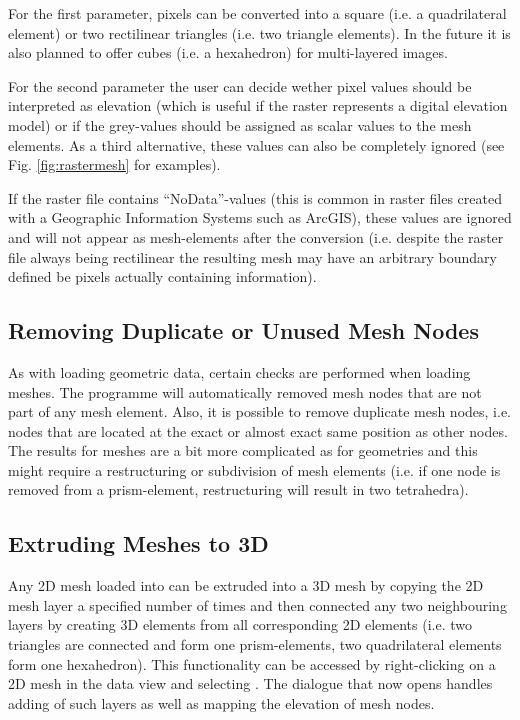 For the first parameter, pixels can be converted into a square (i.e. a quadrilateral element) or two rectilinear triangles (i.e. two triangle elements). In the future it is also planned to offer cubes (i.e. a hexahedron) for multi-layered images.

For the second parameter the user can decide wether pixel values should be interpreted as elevation (which is useful if the raster represents a digital elevation model) or if the grey-values should be assigned as scalar values to the mesh elements. As a third alternative, these values can also be completely ignored (see Fig. \ref{fig:rastermesh} for examples).

If the raster file contains ``NoData''-values (this is common in raster files created with a Geographic Information Systems such as ArcGIS), these values are ignored and will not appear as mesh-elements after the conversion  (i.e. despite the raster file always being rectilinear the resulting mesh may have an arbitrary boundary defined be pixels actually containing information).

\subsection{Removing Duplicate or Unused Mesh Nodes}

As with loading geometric data, certain checks are performed when loading meshes. The programme will automatically removed mesh nodes that are not part of any mesh element. Also, it is possible to remove duplicate mesh nodes, i.e. nodes that are located at the exact or almost exact same position as other nodes. The results for meshes are a bit more complicated as for geometries and this might require a restructuring or subdivision of mesh elements (i.e. if one node is removed from a prism-element, restructuring will result in two tetrahedra).

\subsection{Extruding Meshes to 3D}

Any 2D mesh loaded into \ogs can be extruded into a 3D mesh by copying the 2D mesh layer a specified number of times and then connected any two neighbouring layers by creating 3D elements from all corresponding 2D elements (i.e. two triangles are connected and form one prism-elements, two quadrilateral elements form one hexahedron). This functionality can be accessed by right-clicking on a 2D mesh in the data view and selecting . The dialogue that now opens handles adding of such layers as well as mapping the elevation of mesh nodes.

